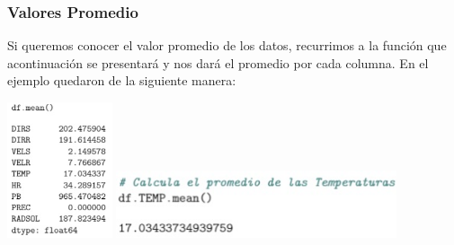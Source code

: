 \documentclass[12pt]{article}
\begin{document}
\subsubsection{Valores Promedio}
Si queremos conocer el valor promedio de los datos, recurrimos a la función que acontinuación se presentará y nos dará el promedio por cada columna. En el ejemplo quedaron de la siguiente manera:
\begin{center}
	\includegraphics[height=4cm]{prom.jpg}           \includegraphics[height=2cm]{prom1.jpg}
\end{center}
\end{document}
